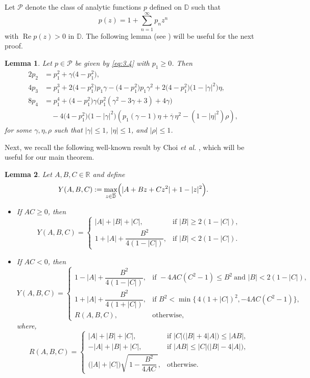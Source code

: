 \documentclass[a4paper,12pt,reqno]{amsart} %
\numberwithin{equation}{section}
\newtheorem{lem}{Lemma}[section]
\theoremstyle{definition}
\newcounter{own}
\begin{document}
Let $\mathcal{P}$ denote the class of analytic functions $p$ defined on $\mathbb{D}$ such that 
\begin{equation}\label{eq:3.4}
p(z)=1+\sum_{n=1}^{\infty} p_n z^n
\end{equation}
with $\operatorname{Re} p(z)>0$ in $\mathbb{D}$. The following lemma 
(see \cite{LiberaZlotkiewicz1982, KwonLeckoSim2018}) will be useful for the next proof.

\begin{lem}\label{lemma1}
Let $p\in \mathcal{P}$ be given by \eqref{eq:3.4} with $p_1\ge 0$. Then
\begin{align*}
2p_2&=p_1^2+\gamma\bigl(4-p_1^2\bigr),\\[2mm]
4p_3&=p_1^3+2\bigl(4-p_1^2\bigr)p_1\gamma
-\bigl(4-p_1^2\bigr)p_1\gamma^2
+2\bigl(4-p_1^2\bigr)\bigl(1-|\gamma|^2\bigr)\eta,\\[2mm]
8p_4&=p_1^4+\bigl(4-p_1^2\bigr)\gamma\bigl(p_1^2(\gamma^2-3\gamma+3)+4\gamma\bigr)\\[1mm]
&\quad
-4\bigl(4-p_1^2\bigr)\bigl(1-|\gamma|^2\bigr)
\left(p_1(\gamma-1)\eta+\overline{\gamma}\,\eta^2-(1-|\eta|^2)\rho\right),
\end{align*}
for some $\gamma,\eta,\rho$ such that $|\gamma|\le 1$, $|\eta|\le 1$, and $|\rho|\le 1$.
\end{lem}
Next, we recall the following well-known result by Choi \textit{et al.} \cite{ChoiKimSugawa2007}, which will be useful for our main theorem.
\begin{lem}\label{lemma2} {\cite{ChoiKimSugawa2007}}
Let $A,B,C\in\mathbb R$ and define
\[
Y(A,B,C):=\max_{z\in\overline{\mathbb D}}\Bigl(|A+Bz+Cz^{2}|+1-|z|^{2}\Bigr).
\]
\begin{itemize}
\item[(i)] If $AC\ge 0$, then
\[
Y(A,B,C)=
\begin{cases}
	|A|+|B|+|C|, & \text{if } |B|\ge 2(1-|C|),\\[6pt]
	1+|A|+\dfrac{B^{2}}{4(1-|C|)}, & \text{if } |B|<2(1-|C|).
\end{cases}
\]
\item[(ii)] If $AC<0$, then
\[
Y(A,B,C)=
\begin{cases}
	1-|A|+\dfrac{B^{2}}{4(1-|C|)}, & \text{if } -4AC(C^{2}-1)\le B^{2}\ \text{and } |B|<2(1-|C|),\\[8pt]
	1+|A|+\dfrac{B^{2}}{4(1+|C|)}, & \text{if } B^{2}<\min\!\bigl\{\,4(1+|C|)^{2},-4AC(C^{2}-1)\bigr\},\\[8pt]
	R(A,B,C), & \text{otherwise,}
\end{cases}
\]
where,
\[
R(A,B,C)=
\begin{cases}
	|A|+|B|+|C|, & \text{if } |C|\bigl(|B|+4|A|\bigr)\le |AB|,\\[6pt]
	-|A|+|B|+|C|, & \text{if } |AB|\le |C|\bigl(|B|-4|A|\bigr),\\[10pt]
	\bigl(|A|+|C|\bigr)\sqrt{\,1-\dfrac{B^{2}}{4AC}\,}, & \text{otherwise.}
\end{cases}
\]
\end{itemize}
\end{lem}
\end{document}
